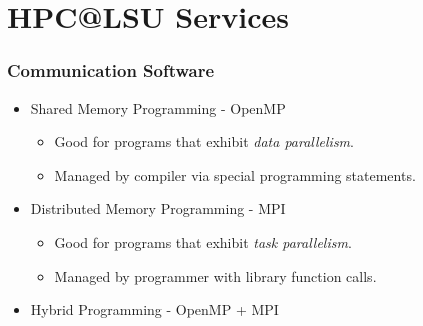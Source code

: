 \documentclass[slidestop,mathserif,compress,xcolor=svgnames,table]{beamer}
\newcommand*\vardiamond{\textcolor{tigerspurple}{%
  \ensuremath{\blacklozenge}}}
\begin{document}
\section{HPC@LSU Services}
\begin{frame}[c]
  \frametitle{\small Communication Software}
  \begin{itemize}
    \item Shared Memory Programming - OpenMP
    \begin{itemize}
      \item[$\vardiamond$] Good for programs that exhibit \textit{data parallelism}.
      \item[$\vardiamond$] Managed by compiler via special programming statements.
    \end{itemize}
    \item Distributed Memory Programming - MPI
    \begin{itemize}
      \item[$\vardiamond$] Good for programs that exhibit \textit{task parallelism}.
      \item[$\vardiamond$] Managed by programmer with library function calls.
    \end{itemize}
    \item Hybrid Programming - OpenMP + MPI
  \end{itemize}
\end{frame}
\end{document}
